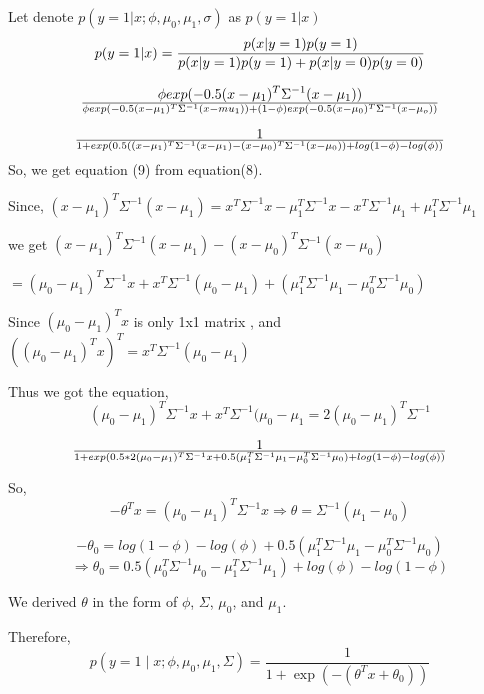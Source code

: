 \begin{answer}
    Let denote $p(y= 1|x; \phi, \mu_0, \mu_1, \sigma)$ as $p(y=1|x)$
	\begin{equation}
	    p(y= 1|x) = {p(x|y=1)p(y=1)\over p(x|y=1)p(y=1)+p(x|y=0)p(y=0)}
	\end{equation}
	
	\begin{equation}
	    \phi exp(-0.5(x-\mu_1)^{T}\Sigma^{-1}(x-\mu_1))\over \phi exp(-0.5(x-\mu_1)^{T}\Sigma^{-1}(x-mu_1))+ (1-\phi)exp(-0.5(x-\mu_0)^{T}\Sigma^{-1}(x-\mu_o)) 
	\end{equation}
	
	\begin{equation}
	     1\over 1+exp(0.5((x-\mu_1)^{T}\Sigma^{-1}(x-\mu_1) - (x-\mu_0)^{T}\Sigma^{-1}(x-\mu_0)) + log(1-\phi) - log(\phi))
	\end{equation}
	So, we get equation (9) from equation(8).
	
	Since, $(x-\mu_1)^{T}\Sigma^{-1}(x-\mu_1) = x^{T}\Sigma^{-1}x - \mu_1^{T}\Sigma^{-1}x - x^{T}\Sigma^{-1}\mu_1 + \mu_1^{T}\Sigma^{-1}\mu_1$
	
	we get $(x-\mu_1)^{T}\Sigma^{-1}(x-\mu_1) - (x-\mu_0)^{T}\Sigma^{-1}(x-\mu_0) $
	
 $	= (\mu_0-\mu_1)^{T}\Sigma^{-1}x + x^{T}\Sigma^{-1}(\mu_0-\mu_1) +(\mu_1^{T}\Sigma^{-1}\mu_1 - \mu_0^{T}\Sigma^{-1}\mu_0)$
	
	
	Since $(\mu_0-\mu_1)^{T}x$ is only 1x1 matrix
	, and $((\mu_0-\mu_1)^{T}x)^{T} = x^{T}\Sigma^{-1}(\mu_0-\mu_1)$
	
	Thus we got the equation,
	\begin{equation}
	(\mu_0-\mu_1)^{T}\Sigma^{-1}x + x^{T}\Sigma^{-1}(\mu_0-\mu_1 = 2(\mu_0-\mu_1)^{T}\Sigma^{-1}
	\end{equation}
	
    \begin{equation}
	1\over 1+exp(0.5*2(\mu_0-\mu_1)^{T}\Sigma^{-1}x+0.5(\mu_1^{T}\Sigma^{-1}\mu_1 - \mu_0^{T}\Sigma^{-1}\mu_0)+log(1-\phi)-log(\phi))
	\end{equation}
	
	So,
	\begin{equation}
	    -\theta^{T}x = (\mu_0-\mu_1)^{T}\Sigma^{-1}x \Rightarrow \theta = \Sigma^{-1}(\mu_1-\mu_0)
	\end{equation}
	
	\begin{equation}
	    -\theta_0 = log(1-\phi)-log(\phi)+0.5(\mu_1^{T}\Sigma^{-1}\mu_1 - \mu_0^{T}\Sigma^{-1}\mu_0) 
	\end{equation}
	\begin{equation}
	    \Rightarrow \theta_0 = 0.5(\mu_0^{T}\Sigma^{-1}\mu_0 - \mu_1^{T}\Sigma^{-1}\mu_1) + log(\phi) - log(1-\phi)
	\end{equation}
	
	We derived $\theta$ in the form of $\phi$, $\Sigma$, $\mu_0$, and $\mu_1$.
	
	Therefore, 
	\begin{equation}
	p(y = 1\mid x; \phi, \mu_0, \mu_1, \Sigma)
	= \frac{1}{1 + \exp(-(\theta^T x + \theta_0))}
	\end{equation}

	
\end{answer}
